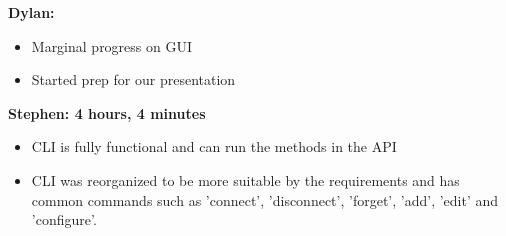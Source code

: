 \documentclass[11pt]{article}
\begin{document}
\textbf{Dylan:}
\begin{itemize}
  \item Marginal progress on GUI
  \item Started prep for our presentation
\end{itemize}

\textbf{Stephen: 4 hours, 4 minutes}
\begin{itemize}
  \item CLI is fully functional and can run the methods in the API 
  \item CLI was reorganized to be more suitable by the requirements and has 
	common commands such as 'connect', 'disconnect', 'forget', 'add', 'edit' 
	and 'configure'.
\end{itemize}
\end{document}
